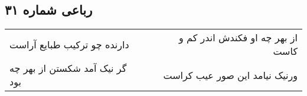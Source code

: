 \begin{center}
\section*{رباعی شماره ۳۱}
\label{sec:sh031}
\begin{longtable}{l p{0.5cm} r}
دارنده چو ترکیب طبایع آراست
&&
از بهر چه او فکندش اندر کم و کاست
\\
گر نیک آمد شکستن از بهر چه بود
&&
ورنیک نیامد این صور عیب کراست
\\
\end{longtable}
\end{center}
